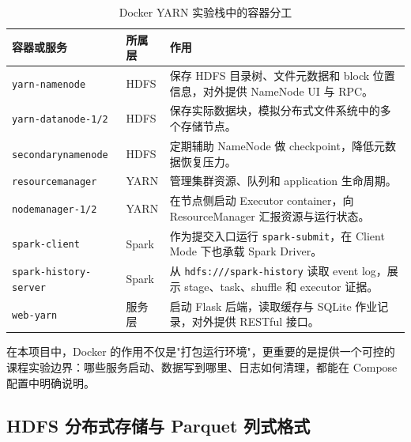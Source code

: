 \begin{table}[htbp]
  \centering
  \caption{Docker YARN 实验栈中的容器分工}
  \label{tab:docker-yarn-roles}
  \begin{tabularx}{0.96\textwidth}{l l X}
    \toprule
    \textbf{容器或服务}                & \textbf{所属层} & \textbf{作用}                                                                        \\
    \midrule
    \texttt{yarn-namenode}        & HDFS         & 保存 HDFS 目录树、文件元数据和 block 位置信息，对外提供 NameNode UI 与 RPC。                              \\
    \texttt{yarn-datanode-1/2}    & HDFS         & 保存实际数据块，模拟分布式文件系统中的多个存储节点。                                                         \\
    \texttt{secondarynamenode}    & HDFS         & 定期辅助 NameNode 做 checkpoint，降低元数据恢复压力。                                              \\
    \texttt{resourcemanager}      & YARN         & 管理集群资源、队列和 application 生命周期。                                                         \\
    \texttt{nodemanager-1/2}      & YARN         & 在节点侧启动 Executor container，向 ResourceManager 汇报资源与运行状态。                             \\
    \texttt{spark-client}         & Spark        & 作为提交入口运行 \texttt{spark-submit}，在 Client Mode 下也承载 Spark Driver。                    \\
    \texttt{spark-history-server} & Spark        & 从 \texttt{hdfs:///spark-history} 读取 event log，展示 stage、task、shuffle 和 executor 证据。 \\
    \texttt{web-yarn}             & 服务层          & 启动 Flask 后端，读取缓存与 SQLite 作业记录，对外提供 RESTful 接口。                                        \\
    \bottomrule
  \end{tabularx}
\end{table}

在本项目中，Docker 的作用不仅是"打包运行环境"，更重要的是提供一个可控的课程实验边界：哪些服务启动、数据写到哪里、日志如何清理，都能在 Compose 配置中明确说明。

\subsection{HDFS 分布式存储与 Parquet 列式格式}


